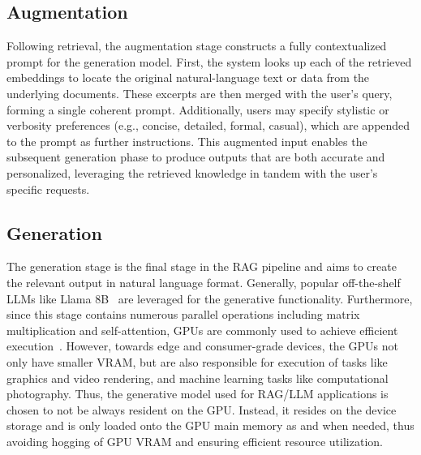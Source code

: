 
\subsection{Augmentation}
\label{sec:BG:Augmentation}
Following retrieval, the augmentation stage constructs a fully contextualized prompt for the generation model. First, the system looks up each of the \topk retrieved embeddings to locate the original natural-language text or data from the underlying documents. These excerpts are then merged with the user’s query, forming a single coherent prompt. Additionally, users may specify stylistic or verbosity preferences (e.g., concise, detailed, formal, casual), which are appended to the prompt as further instructions. This augmented input enables the subsequent generation phase to produce outputs that are both accurate and personalized, leveraging the retrieved knowledge in tandem with the user’s specific requests.

\subsection{Generation}
\label{sec:BG:Generation}
The generation stage is the final stage in the RAG pipeline and aims to create the relevant output in natural language format. Generally, popular off-the-shelf LLMs like Llama 8B~\cite{llama_3_1_8b_instruct} are leveraged for the generative functionality. Furthermore, since this stage contains numerous parallel operations including matrix multiplication and self-attention, GPUs are commonly used to achieve efficient execution~\cite{attention_gpu}. However, towards edge and consumer-grade devices, the GPUs not only have smaller VRAM, but are also responsible for execution of tasks like graphics and video rendering, and machine learning tasks like computational photography. Thus, the generative model used for RAG/LLM applications is chosen to not be always resident on the GPU. Instead, it resides on the device storage and is only loaded onto the GPU main memory as and when needed, thus avoiding hogging of GPU VRAM and ensuring efficient resource utilization. 

